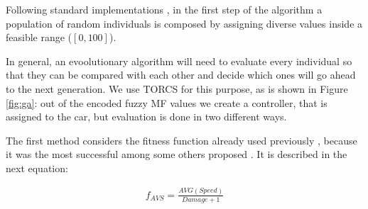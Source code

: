 \documentclass[10pt,journal,compsoc]{IEEEtran}
\begin{document}




Following standard implementations \cite{GAs_Goldberg89}, in the first step of the algorithm \cite{salem_evo17} a population of random individuals is composed by assigning diverse values inside a feasible range ($[0,100]$).

In general, an evoolutionary algorithm will need to evaluate every
individual so that they can be compared with each other and decide
which ones will go ahead to the next generation. We use TORCS for this
purpose, as is shown in Figure \ref{fig:ga}: out of the encoded fuzzy
MF values we create a controller, that is assigned to the car, but
evaluation is done in two different ways.

The first method considers the fitness function already used
previously \cite{salem_cig2018}, because it was the most successful 
among some others proposed \cite{salem_evo18}. It is described in the
next equation: 

 \begin{equation} \label{fit_avg}
 	\begin{array}{lll}
 		f_{AVS}= \frac{AVG(Speed)}{Damage+1}
 	\end{array}
 \end{equation}	
\end{document}

